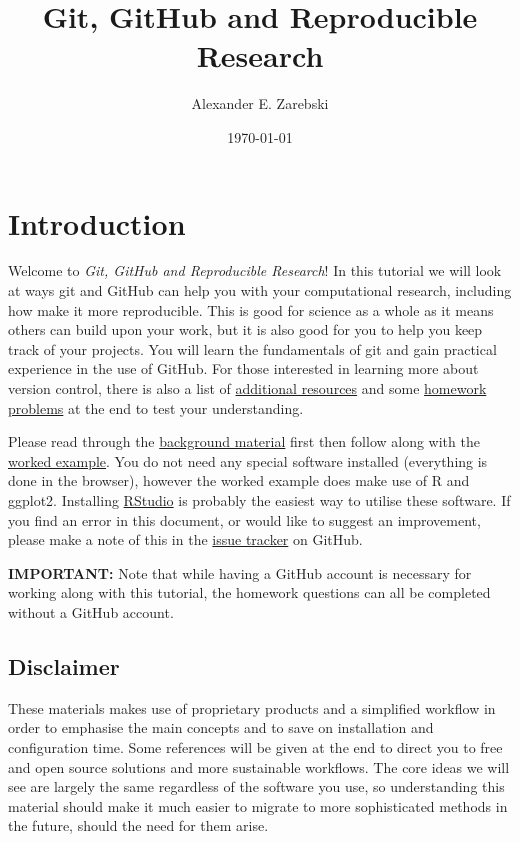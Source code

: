 \documentclass[11pt,onecolumn]{scrartcl}
\author{Alexander E. Zarebski}
\date{\today}
\title{Git, GitHub and Reproducible Research}
\begin{document}
\maketitle
\setcounter{tocdepth}{2}
\tableofcontents


\section{Introduction}
\label{sec:org52fe99d}

Welcome to \emph{Git, GitHub and Reproducible Research}! In this tutorial we will
look at ways git and GitHub can help you with your computational research,
including how make it more reproducible. This is good for science as a whole as
it means others can build upon your work, but it is also good for you to help
you keep track of your projects. You will learn the fundamentals of git and gain
practical experience in the use of GitHub. For those interested in learning more
about version control, there is also a list of \hyperref[sec:orga3aa16d]{additional resources} and some
\hyperref[sec:orgd4ae0e6]{homework problems} at the end to test your understanding.

Please read through the \hyperref[sec:orgeb40031]{background material} first then follow along with the \hyperref[sec:orgd479495]{worked example}. You do not need any special software installed (everything is
done in the browser), however the worked example does make use of R and ggplot2.
Installing \href{https://www.rstudio.com/}{RStudio} is probably the easiest way to utilise these software. If you
find an error in this document, or would like to suggest an improvement, please
make a note of this in the \href{https://github.com/aezarebski/github-tutorial/issues/new/choose}{issue tracker} on GitHub.

\textbf{IMPORTANT:} Note that while having a GitHub account is necessary for working
along with this tutorial, the homework questions can all be completed without a
GitHub account.

\subsection{Disclaimer}
\label{sec:orgcd6fecb}

These materials makes use of proprietary products and a simplified workflow in
order to emphasise the main concepts and to save on installation and
configuration time. Some references will be given at the end to direct you to
free and open source solutions and more sustainable workflows. The core ideas we
will see are largely the same regardless of the software you use, so
understanding this material should make it much easier to migrate to more
sophisticated methods in the future, should the need for them arise.
\end{document}

